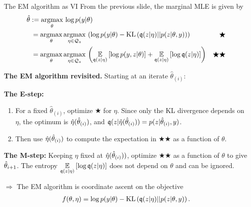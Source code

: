 \begin{frame}{The EM algorithm as VI}
%
From the previous slide, the marginal MLE is given by
%
\begin{align*}
%
\MoveEqLeft
\thetahat := \argmax{\theta} \log p(\y | \theta) \\
={}&
\argmax{\theta} \argmax{\eta \in \qdom_z} \left(
\log p(\y | \theta) -
    \kl{\q(\z | \eta)}{p(\z | \theta, \y)}  \right) & \bigstar
\\={}&
\argmax{\theta} \argmax{\eta \in \qdom_z} \left(
\expect{\q(\z | \eta)}{
    \log p(\y, \z | \theta) }
+ \expect{\q(\z | \eta)}{\log \q(\z | \eta)
}\right) & \bigstar\bigstar
%
\end{align*}
%

\pause
\hrulefill

\textbf{The EM algorithm revisited.}  Starting at an iterate $\hat\theta_{(i)}$:

\textbf{The E-step:}
\begin{enumerate}
%
    \item For a fixed $\hat\theta_{(i)}$, optimize
$\bigstar$ for $\eta$.  Since only the KL divergence depends on
$\eta$, the optimum is $\hat{\eta}(\hat\theta_{(i)})$,
and $\mathfrak{q}(z | \hat{\eta}(\hat\theta_{(i)})) = p(z | \hat\theta_{(i)}, y)$.
%
    \item Then use $\hat{\eta}(\hat\theta_{(i)})$ to compute the expectation in
$\bigstar\bigstar$ as a function of $\theta$.
%
\end{enumerate}

\textbf{The M-step:}  Keeping $\eta$ fixed at $\hat{\eta}(\hat\theta_{(i)}))$,
optimize $\bigstar\bigstar$ as a function of $\theta$ to give
$\hat\theta_{i + 1}$.  The entropy
$\underset{\mathfrak{q}(z | \eta)}{\mathbb{E}}\left[\log \mathfrak{q}(z | \eta)\right]$ does not depend on $\theta$
and can be ignored.

\pause

\hrulefill

$\Rightarrow$ The EM algorithm is coordinate ascent on the objective
%
\begin{align*}
%
f(\theta, \eta) =
\log p(\y | \theta) - \kl{\q(\z | \eta)}{p(\z | \theta, \y)}.
%
\end{align*}

\end{frame}


